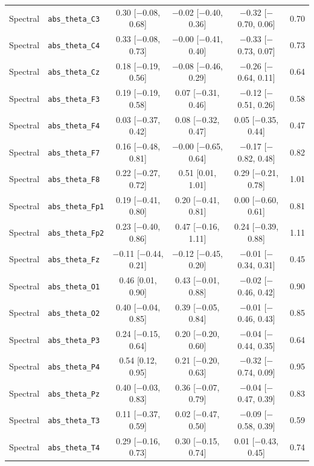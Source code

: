 {\begin{longtable}{llcccc}
Spectral & \texttt{abs\_theta\_C3} & 0.30 [$-$0.08, 0.68] & $-$0.02 [$-$0.40, 0.36] & $-$0.32 [$-$0.70, 0.06] & 0.70 \\
Spectral & \texttt{abs\_theta\_C4} & 0.33 [$-$0.08, 0.73] & $-$0.00 [$-$0.41, 0.40] & $-$0.33 [$-$0.73, 0.07] & 0.73 \\
Spectral & \texttt{abs\_theta\_Cz} & 0.18 [$-$0.19, 0.56] & $-$0.08 [$-$0.46, 0.29] & $-$0.26 [$-$0.64, 0.11] & 0.64 \\
Spectral & \texttt{abs\_theta\_F3} & 0.19 [$-$0.19, 0.58] & 0.07 [$-$0.31, 0.46] & $-$0.12 [$-$0.51, 0.26] & 0.58 \\
Spectral & \texttt{abs\_theta\_F4} & 0.03 [$-$0.37, 0.42] & 0.08 [$-$0.32, 0.47] & 0.05 [$-$0.35, 0.44] & 0.47 \\
Spectral & \texttt{abs\_theta\_F7} & 0.16 [$-$0.48, 0.81] & $-$0.00 [$-$0.65, 0.64] & $-$0.17 [$-$0.82, 0.48] & 0.82 \\
Spectral & \texttt{abs\_theta\_F8} & 0.22 [$-$0.27, 0.72] & 0.51 [0.01, 1.01] & 0.29 [$-$0.21, 0.78] & 1.01 \\
Spectral & \texttt{abs\_theta\_Fp1} & 0.19 [$-$0.41, 0.80] & 0.20 [$-$0.41, 0.81] & 0.00 [$-$0.60, 0.61] & 0.81 \\
Spectral & \texttt{abs\_theta\_Fp2} & 0.23 [$-$0.40, 0.86] & 0.47 [$-$0.16, 1.11] & 0.24 [$-$0.39, 0.88] & 1.11 \\
Spectral & \texttt{abs\_theta\_Fz} & $-$0.11 [$-$0.44, 0.21] & $-$0.12 [$-$0.45, 0.20] & $-$0.01 [$-$0.34, 0.31] & 0.45 \\
Spectral & \texttt{abs\_theta\_O1} & 0.46 [0.01, 0.90] & 0.43 [$-$0.01, 0.88] & $-$0.02 [$-$0.46, 0.42] & 0.90 \\
Spectral & \texttt{abs\_theta\_O2} & 0.40 [$-$0.04, 0.85] & 0.39 [$-$0.05, 0.84] & $-$0.01 [$-$0.46, 0.43] & 0.85 \\
Spectral & \texttt{abs\_theta\_P3} & 0.24 [$-$0.15, 0.64] & 0.20 [$-$0.20, 0.60] & $-$0.04 [$-$0.44, 0.35] & 0.64 \\
Spectral & \texttt{abs\_theta\_P4} & 0.54 [0.12, 0.95] & 0.21 [$-$0.20, 0.63] & $-$0.32 [$-$0.74, 0.09] & 0.95 \\
Spectral & \texttt{abs\_theta\_Pz} & 0.40 [$-$0.03, 0.83] & 0.36 [$-$0.07, 0.79] & $-$0.04 [$-$0.47, 0.39] & 0.83 \\
Spectral & \texttt{abs\_theta\_T3} & 0.11 [$-$0.37, 0.59] & 0.02 [$-$0.47, 0.50] & $-$0.09 [$-$0.58, 0.39] & 0.59 \\
Spectral & \texttt{abs\_theta\_T4} & 0.29 [$-$0.16, 0.73] & 0.30 [$-$0.15, 0.74] & 0.01 [$-$0.43, 0.45] & 0.74 \\

\end{longtable}}
